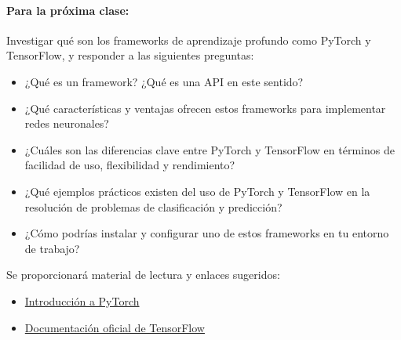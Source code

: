 \documentclass[a4,11pt]{aleph-notas}
\begin{document}
\paragraph{Para la próxima clase:} 
Investigar qué son los frameworks de aprendizaje profundo como PyTorch y TensorFlow, y responder a las siguientes preguntas:
\begin{itemize}[leftmargin=*]
    \item ¿Qué es un framework? ¿Qué es una API en este sentido?
    \item ¿Qué características y ventajas ofrecen estos frameworks para implementar redes neuronales?
    \item ¿Cuáles son las diferencias clave entre PyTorch y TensorFlow en términos de facilidad de uso, flexibilidad y rendimiento?
    \item ¿Qué ejemplos prácticos existen del uso de PyTorch y TensorFlow en la resolución de problemas de clasificación y predicción?
    \item ¿Cómo podrías instalar y configurar uno de estos frameworks en tu entorno de trabajo?
\end{itemize}

Se proporcionará material de lectura y enlaces sugeridos:
\begin{itemize}
    \item \href{https://pytorch.org/tutorials/}{Introducción a PyTorch}
    \item \href{https://www.tensorflow.org/}{Documentación oficial de TensorFlow}
\end{itemize}
\end{document}
